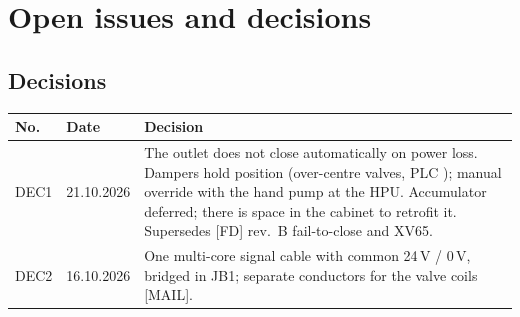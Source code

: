 \documentclass[11pt,a4paper]{article}
\begin{document}
\section{Open issues and decisions}
\label{sec:open}

\subsection{Decisions}
\begin{small}
\begin{tabularx}{\textwidth}{@{}lP{20mm}L@{}}
\toprule
No. & Date & Decision \\
\midrule
DEC1 & 21.10.2026 & The outlet does not close automatically on power loss. Dampers hold position (over-centre valves, PLC
  ); manual override with the hand pump at the HPU. Accumulator deferred; there is space in the
  cabinet to retrofit it. Supersedes [FD] rev.~B fail-to-close and XV65. \\
DEC2 & 16.10.2026 & One multi-core signal cable with common 24\,V / 0\,V, bridged in JB1; separate conductors for the valve
  coils [MAIL]. \\
\bottomrule
\end{tabularx}
\end{small}
\end{document}
